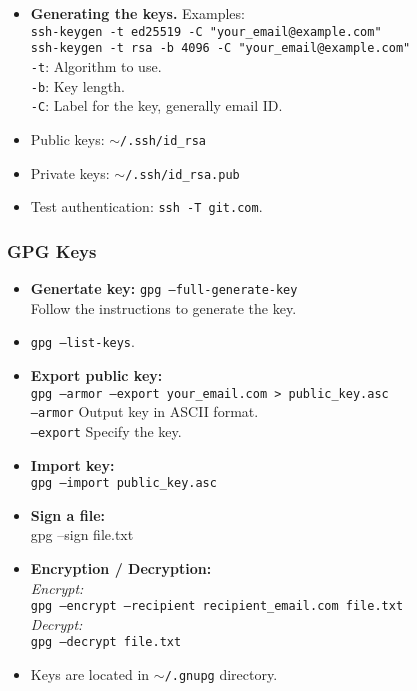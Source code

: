 \begin{itemize}
    \item \textbf{Generating the keys.} Examples:\\
            \texttt{ssh-keygen -t ed25519 -C "your\_email@example.com"}\\
            \texttt{ssh-keygen -t rsa -b 4096 -C "your\_email@example.com"}\\
            \texttt{-t}: Algorithm to use.\\
            \texttt{-b}: Key length.\\
            \texttt{-C}: Label for the key, generally email ID.\\
    \item   Public keys: \texttt{$\sim$/.ssh/id\_rsa}\\
    \item   Private keys: \texttt{$\sim$/.ssh/id\_rsa.pub}\\
    \item   Test authentication: \texttt{ssh -T git\@github.com}.\\
\end{itemize}

\subsubsection{GPG Keys}

\begin{itemize}
\item \textbf{Genertate key:} \texttt{gpg --full-generate-key}\\
        Follow the instructions to generate the key.\\
\item \texttt{gpg --list-keys}.
\item  \textbf{Export public key:}\\
        \texttt{gpg --armor --export your\_email\@example.com > public\_key.asc}\\
            \texttt{--armor} Output key in ASCII format.\\
            \texttt{--export} Specify the key.\\
\item \textbf{Import key:}\\
        \texttt{gpg --import public\_key.asc}\\
\item \textbf{Sign a file:}\\
        gpg --sign file.txt\\
\item  \textbf{Encryption / Decryption:}\\
        \textit{Encrypt:}\\
        \texttt{gpg --encrypt --recipient recipient\_email\@example.com file.txt}\\
        \textit{Decrypt:}\\
        \texttt{gpg --decrypt file.txt}\\
\item Keys are located in \texttt{$\sim$/.gnupg} directory.
\end{itemize}


